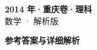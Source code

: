 \documentclass[zihao=-4, a4paper]{ctexart}
\begin{document}
\begin{center}
  {\Large\bfseries 2014 年·重庆卷·理科}\\[4pt]
  {\large 数学 · 解析版}
\end{center}
\medskip
{}

\clearpage
{}
\begin{center}{\Large\bfseries 参考答案与详细解析}\end{center}
\medskip

\end{document}
